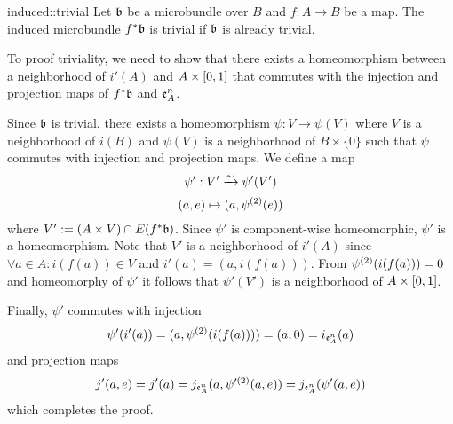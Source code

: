\begin{mylemma}{induced::trivial}
    Let $\mathfrak{b}$ be a microbundle over $B$ and $f: A \to B$ be a map.
    The induced microbundle $f^*\mathfrak{b}$ is trivial if $\mathfrak{b}$ is already trivial.
\end{mylemma}

\begin{myproof}
    To proof triviality, we need to show that there exists a homeomorphism between a neighborhood of $i'(A)$ and $A \times{} [0, 1]$
    that commutes with the injection and projection maps of $f^*\mathfrak{b}$ and $\mathfrak{e}^{n}_A$.
    
    Since $\mathfrak{b}$ is trivial, there exists a homeomorphism $\psi: V \to \psi(V)$
    where $V$ is a neighborhood of $i(B)$ and $\psi(V)$ is a neighborhood of $B \times \{0\}$
    such that $\psi$ commutes with injection and projection maps.
    We define a map 
    \[ \psi': V' \xrightarrow{\sim} \psi'(V') \]
    \[ (a, e) \mapsto (a, \psi^{(2)}(e)) \]
    where $V' := (A \times V) \cap E(f^*\mathfrak{b})$.
    Since $\psi'$ is component-wise homeomorphic, $\psi'$ is a homeomorphism.
    Note that $V'$ is a neighborhood of $i'(A)$ since $\forall a \in A: i(f(a)) \in V$ and $i'(a) = (a, i(f(a)))$.
    From $\psi^{(2)}(i(f(a))) = 0$ and homeomorphy of $\psi'$ it follows that $\psi'(V')$ is a neighborhood of $A \times{} [0, 1]$.

    Finally, $\psi'$ commutes with injection
    \[ \psi'(i'(a)) = (a, \psi^{(2)}(i(f(a)))) = (a, 0) = i_{\mathfrak{e}^{n}_A}(a) \]
    and projection maps
    \[ j'(a, e) = j'(a) = j_{\mathfrak{e}^{n}_A}(a, \psi'^{(2)}(a, e)) = j_{\mathfrak{e}^{n}_A}(\psi'(a, e)) \]
    which completes the proof.
\end{myproof}